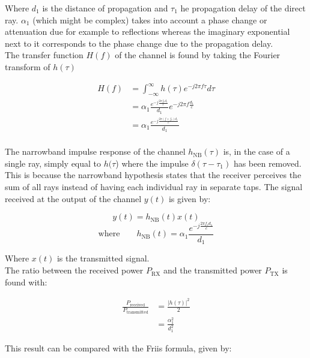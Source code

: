 \documentclass[10pt,a4paper]{ULBreport}
\begin{document}
Where $d_1$ is the distance of propagation and $\tau_1$ he propagation delay of the direct ray. $\alpha_1$ (which might be complex) takes into account a phase change or attenuation due for example to reflections whereas the imaginary exponential next to it corresponds to the phase change due to the propagation delay. \\
The transfer function $H(f)$ of the channel is found by taking the Fourier transform of $h(\tau)$
\vspace{-1cm}

\begin{align*}
    H(f) &= \int_{-\infty}^{\infty} h(\tau) e^{-j2\pi f \tau} d\tau\\
    &= \alpha_1\frac{e^{-j\frac{2\pi f_c d_1}{c}}}{d_1}e^{-j2\pi f \frac{d_1}{c}}\\
    &= \alpha_1\frac{e^{-j \frac{2\pi (f+f_c)d_1}{c}}}{d_1}\\
\end{align*}

\vspace{-1cm}
The narrowband impulse response of the channel $h_{\text{NB}}(\tau)$ is, in the case of a single ray, simply equal to $h(\tau$) where the impulse $\delta\left(\tau - \tau_1\right)$ has been removed. This is because the narrowband hypothesis states that the receiver perceives the sum of all rays instead of having each individual ray in separate taps. The signal received at the output of the channel $y(t)$ is given by:

\begin{equation*}
    y(t) = h_{\text{NB}}(t) x(t)
\end{equation*}
\begin{equation*}
    \text{where} \qquad h_{\text{NB}}(t) =\alpha_1\frac{e^{-j \frac{2\pi f_cd_1}{c}}}{d_1}
\end{equation*}

Where $x(t)$ is the transmitted signal. \\
The ratio between the received power $P_{\text{RX}}$ and the transmitted power $P_{\text{TX}}$ is found with:
\vspace{-1cm}

\begin{align}
    \frac{P_{\text{received}}}{P_{\text{transmitted}}} &= \frac{\left| h(\tau) \right|^2}{2} \nonumber\\
    &= \frac{\alpha_1^2}{d_1^2}
    \label{eq:power_approx}
\end{align}

This result can be compared with the Friis formula, given by:
\end{document}
